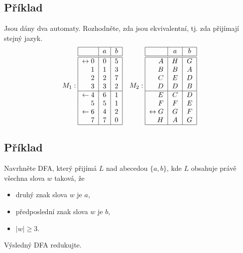 \subsection{Příklad}
Jsou dány dva automaty. Rozhodněte, zda jsou ekvivalentní, tj. zda přijímají stejný jazyk.
\[
M_1:
\begin{tabular}{|r|c|c|}
    \hline
    & $a$ & $b$\\
    \hline
    \hline
    $\leftrightarrow 0$& $0$ & $5$\\
    $1$                & $1$ & $3$\\
    $2$                & $2$ & $7$\\
    $3$                & $3$ & $2$\\
    \hline
    $\leftarrow 4$     & $6$ & $1$\\
    $5$                & $5$ & $1$\\
    $\leftarrow 6$     & $4$ & $2$\\
    $7$                & $7$ & $0$\\
    \hline
\end{tabular}
\quad
M_2:
\begin{tabular}{|r|c|c|}
    \hline
    & $a$ & $b$\\
    \hline
    \hline
    $A$                & $H$ & $G$\\
    $B$                & $B$ & $A$\\
    $C$                & $E$ & $D$\\
    $D$                & $D$ & $B$\\
    \hline
    $E$                & $C$ & $D$\\
    $F$                & $F$ & $E$\\
    $\leftrightarrow G$& $G$ & $F$\\
    $H$                & $A$ & $G$\\
    \hline
\end{tabular}
\]

\subsection{Příklad}
Navrhněte DFA, který přijímá $L$ nad abecedou $\{a,b\}$, kde $L$ obsahuje právě všechna slova $w$ taková, že
\begin{itemize}[noitemsep]
    \item druhý znak slova $w$ je $a$,
    \item předposlední znak slova $w$ je $b$,
    \item $|w| \geq 3$.
\end{itemize}
Výsledný DFA redukujte.

